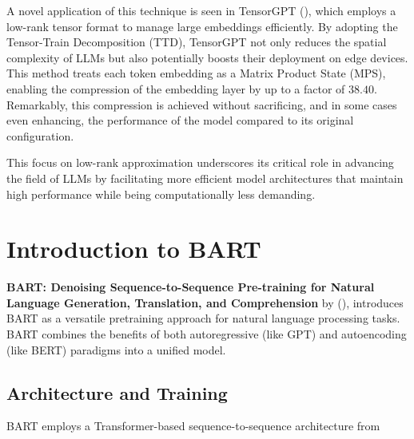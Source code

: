        A novel application of this technique is seen in TensorGPT (\cite{xu2023tensorgpt}), which employs a low-rank tensor format to manage large embeddings efficiently. By adopting the Tensor-Train Decomposition (TTD), TensorGPT not only reduces the spatial complexity of LLMs but also potentially boosts their deployment on edge devices. This method treats each token embedding as a Matrix Product State (MPS), enabling the compression of the embedding layer by up to a factor of \(38.40\). Remarkably, this compression is achieved without sacrificing, and in some cases even enhancing, the performance of the model compared to its original configuration.
        
        This focus on low-rank approximation underscores its critical role in advancing the field of LLMs by facilitating more efficient model architectures that maintain high performance while being computationally less demanding.
        

\section{Introduction to BART}\label{sec:bart}
    \textbf{BART: Denoising Sequence-to-Sequence Pre-training for Natural Language Generation, Translation, and Comprehension} by (\cite{lewis2019bart}), introduces BART as a versatile pretraining approach for natural language processing tasks. BART combines the benefits of both autoregressive (like GPT) and autoencoding (like BERT) paradigms into a unified model.

    \subsection{Architecture and Training}
    BART employs a Transformer-based sequence-to-sequence architecture from 
    
